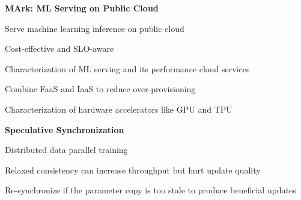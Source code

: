 \documentclass[12pt]{article}
\begin{document}
\textbf{MArk: ML Serving on Public Cloud}
\vspace{2pt}
\begin{compactenum}[-]
\item Serve machine learning inference on public cloud
\item Cost-effective and SLO-aware
\item Characterization of ML serving and its performance cloud services
\item Combine FaaS and IaaS to reduce over-provisioning
\item Characterization of hardware accelerators like GPU and TPU
\end{compactenum}
\vspace{5pt}

\textbf{Speculative Synchronization}
\vspace{2pt}
\begin{compactenum}[-]
\item Distributed data parallel training
\item Relaxed consistency can increase throughput but hurt update quality
\item Re-synchronize if the parameter copy is too stale to produce beneficial updates
\end{compactenum}
\end{document}

